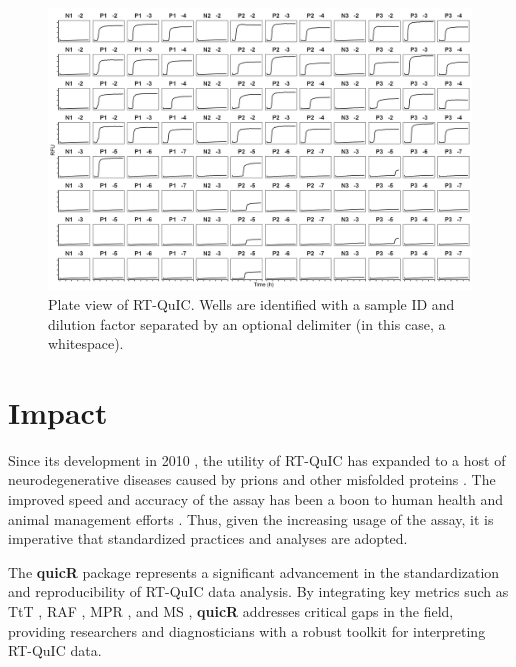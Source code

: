 \documentclass[preprint,12pt,a4paper]{elsarticle}
\begin{document}
            \begin{figure}[ht]
                \centering
                \includegraphics[width=\textwidth]{images/plate_view.png}
                \caption{Plate view of RT-QuIC. Wells are identified with a sample ID and dilution factor separated by an optional delimiter (in this case, a whitespace).}
                \label{fig:plateview}
            \end{figure}
            
    \section{Impact}
        Since its development in 2010 \cite{Wilham2010,Atarashi2011}, the utility of RT-QuIC has expanded to a host of neurodegenerative diseases caused by prions and other misfolded proteins \cite{Orru2024,ALWAKIL202597,Wang2024}. The improved speed and accuracy of the assay has been a boon to human health \cite{Orru2015,green2019rt,race2019transmission,vascellari2022real} and animal management efforts \cite{huang2025chronic,cooper2019detection,piel2024validation,harpaz2024transmission}. Thus, given the increasing usage of the assay, it is imperative that standardized practices and analyses are adopted.

        The \textbf{quicR} package represents a significant advancement in the standardization and reproducibility of RT-QuIC data analysis. By integrating key metrics such as TtT \cite{Orru2015}, RAF \cite{Gallups2022}, MPR \cite{Rowden2023}, and MS \cite{Henderson2015}, \textbf{quicR} addresses critical gaps in the field, providing researchers and diagnosticians with a robust toolkit for interpreting RT-QuIC data.
\end{document}
